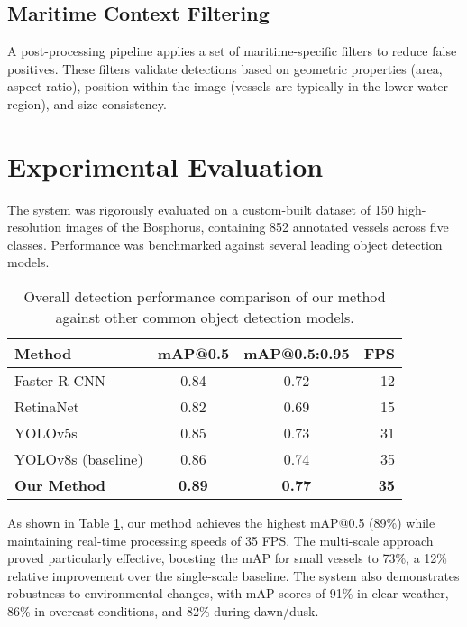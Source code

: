 \documentclass[10pt]{article}
\begin{document}
\subsection{Maritime Context Filtering}
A post-processing pipeline applies a set of maritime-specific filters to reduce false positives. These filters validate detections based on geometric properties (area, aspect ratio), position within the image (vessels are typically in the lower water region), and size consistency.

\section{Experimental Evaluation}
The system was rigorously evaluated on a custom-built dataset of 150 high-resolution images of the Bosphorus, containing 852 annotated vessels across five classes\cite{liu2021enhanced}. Performance was benchmarked against several leading object detection models.

\begin{table}[!ht]
\centering
\caption{Overall detection performance comparison of our method against other common object detection models.}
\label{tab:detection_performance}
  \begin{tabular}{|l|c|c|r|}
  \hline
   \textbf{Method} & \textbf{mAP@0.5} & \textbf{mAP@0.5:0.95} & \textbf{FPS} \\\hline
   Faster R-CNN & 0.84 & 0.72 & 12 \\\hline
   RetinaNet & 0.82 & 0.69 & 15 \\\hline
   YOLOv5s & 0.85 & 0.73 & 31 \\\hline
   YOLOv8s (baseline) & 0.86 & 0.74 & 35 \\\hline
   \textbf{Our Method} & \textbf{0.89} & \textbf{0.77} & \textbf{35} \\\hline
  \end{tabular}
\end{table}

As shown in Table \ref{tab:detection_performance}, our method achieves the highest mAP@0.5 (89\%) while maintaining real-time processing speeds of 35 FPS. The multi-scale approach proved particularly effective, boosting the mAP for small vessels to 73\%, a 12\% relative improvement over the single-scale baseline. The system also demonstrates robustness to environmental changes, with mAP scores of 91\% in clear weather, 86\% in overcast conditions, and 82\% during dawn/dusk.
\end{document}

